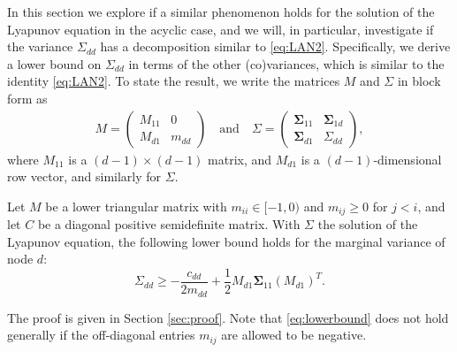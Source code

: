 \documentclass[10pt,twoside,a4paper]{amsart}
\newcommand{\bSigma}{\boldsymbol \Sigma}
\begin{document}
In this section we explore if a similar phenomenon holds for the solution of the
Lyapunov equation in the acyclic case, and we will, in particular, investigate
if the variance $\Sigma_{dd}$ has a decomposition similar to \eqref{eq:LAN2}.
Specifically, we derive a lower bound on $\Sigma_{dd}$ in terms of the other
(co)variances, which is similar to the identity \eqref{eq:LAN2}. To state the
result, we write the matrices $M$ and $\Sigma$ in block form as
\begin{align*}
    M = \begin{pmatrix}
        M_{11} & 0\\
        M_{d1} & m_{dd}
    \end{pmatrix} \quad \text{and} \quad
    \Sigma = \begin{pmatrix}
        \bSigma_{11} & \bSigma_{1d} \\
        \bSigma_{d1} & \Sigma_{dd}
    \end{pmatrix},
\end{align*}
where $M_{11}$ is a $(d-1) \times (d-1)$ matrix, 
 and $M_{d1}$ is a $(d-1)$-dimensional row vector, and similarly for
$\Sigma$.

\begin{proposition} \label{prop:lowerbound}
    Let $M$ be a lower triangular matrix with $m_{ii} \in [-1,0)$ and 
    $m_{ij} \geq 0$ for $j < i$, and let $C$ be a diagonal 
    positive semidefinite matrix. With $\Sigma$ the solution of 
    the Lyapunov equation, the following lower bound holds for the marginal 
    variance of node $d$:
    \begin{equation} \label{eq:lowerbound}
        \Sigma_{dd} \geq  - \frac{c_{dd}}{2 m_{dd}}  + 
        \frac{1}{2} M_{d1} \bSigma_{11} (M_{d1})^T.
    \end{equation}
\end{proposition}

The proof is given in Section \ref{sec:proof}. Note that \eqref{eq:lowerbound}
does not hold generally if the off-diagonal entries $m_{ij}$ are allowed to 
be negative. 
\end{document}
